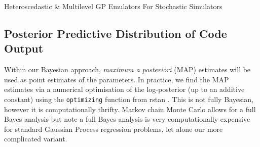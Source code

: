 \begin{chapter}{Heteroscedastic \& Multilevel GP Emulators For Stochastic Simulators\label{Ch:Hetsml}}
\subsection{Posterior Predictive Distribution of Code Output}
Within our Bayesian approach, \textit{maximum a posteriori} (MAP) estimates will be used as point estimates of the parameters.  In practice, we find the MAP estimates via a numerical optimisation of the log-posterior (up to an additive constant) using the \verb|optimizing| function from rstan \cite{stan}. This is not fully Bayesian, however it is computationally thrifty. Markov chain Monte Carlo allows for a full Bayes analysis but \cite{Kersting2007} note a full Bayes analysis is very computationally expensive for standard Gaussian Process regression problems, let alone our more complicated variant.


\end{chapter}
